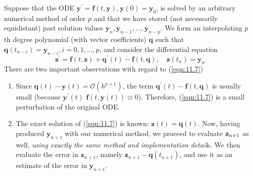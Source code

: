 \documentclass[a4paper]{article}
\begin{document}
\begin{technique}
    Suppose that the ODE $\mathbf{y}^{\prime}=\mathbf{f}(t, \mathbf{y}), \mathbf{y}(0)=\mathbf{y}_0$, is solved by an arbitrary numerical method of order $p$ and that we have stored (not necessarily equidistant) past solution values $\mathbf{y}_n, \mathbf{y}_{n-1}, \ldots, \mathbf{y}_{n-p}$. We form an interpolating $p$ th degree polynomial (with vector coefficients) $\mathbf{q}$ such that $\mathbf{q}\left(t_{n-i}\right)=\mathbf{y}_{n-i}, i=0,1, \ldots, p$, and consider the differential equation
    \begin{equation}\label{eqn:11.7}
        \mathbf{z}^{\prime}=\mathbf{f}(t, \mathbf{z})+\mathbf{q}^{\prime}(t)-\mathbf{f}(t, \mathbf{q}), \quad \mathbf{z}\left(t_n\right)=\mathbf{y}_n
    \end{equation}
    There are two important observations with regard to (\ref{eqn:11.7})

    \begin{enumerate}[(1)]
        \item Since $\mathbf{q}(t)-\mathbf{y}(t)=\mathcal{O}\left(h^{p+1}\right)$, the term $\mathbf{q}^{\prime}(t)-\mathbf{f}(t, \mathbf{q})$ is usually small (because $\mathbf{y}^{\prime}(t)$ $\mathbf{f}(t, \mathbf{y}(t)) \equiv 0$). Therefore, (\ref{eqn:11.7}) is a small perturbation of the original ODE.
    
        \item The exact solution of (\ref{eqn:11.7}) is known: $\mathbf{z}(t)=\mathbf{q}(t)$. Now, having produced $\mathbf{y}_{n+1}$ with our numerical method, we proceed to evaluate ${\bf z}_{n+1}$ as well, \textit{using exactly the same method and implementation detail}s. We then evaluate the error in $\mathbf{z}_{n+1}$, namely $\mathbf{z}_{n+1}-\mathbf{q}\left(t_{n+1}\right)$, and use it as an estimate of the error in $\mathbf{y}_{n+1}$.
    \end{enumerate}
\end{technique}
\end{document}
